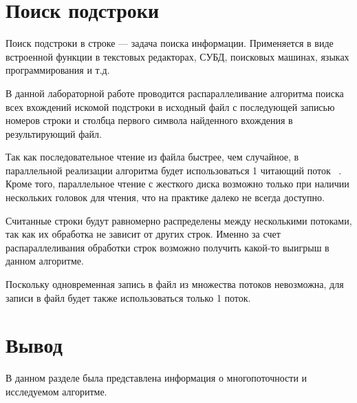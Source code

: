 \section{Поиск подстроки}
Поиск подстроки в строке — задача поиска информации.
Применяется в виде встроенной функции в текстовых редакторах, СУБД, поисковых машинах, языках программирования и т.д.

В данной лабораторной работе проводится распараллеливание алгоритма поиска всех вхождений искомой подстроки в исходный файл с последующей записью номеров строки и столбца первого символа найденного вхождения в результирующий файл.

Так как последовательное чтение из файла быстрее, чем случайное, в параллельной реализации алгоритма будет использоваться 1 читающий поток ~\cite{multithreading}.
Кроме того, параллельное чтение с жесткого диска возможно только при наличии нескольких головок для чтения, что на практике далеко не всегда доступно.

Считанные строки будут равномерно распределены между несколькими потоками, так как их обработка не зависит от других строк.
Именно за счет распараллеливания обработки строк возможно получить какой-то выигрыш в данном алгоритме.

Поскольку одновременная запись в файл из множества потоков невозможна, для записи в файл будет также использоваться только 1 поток.

\section*{Вывод}
В данном разделе была представлена информация о многопоточности и исследуемом алгоритме.
